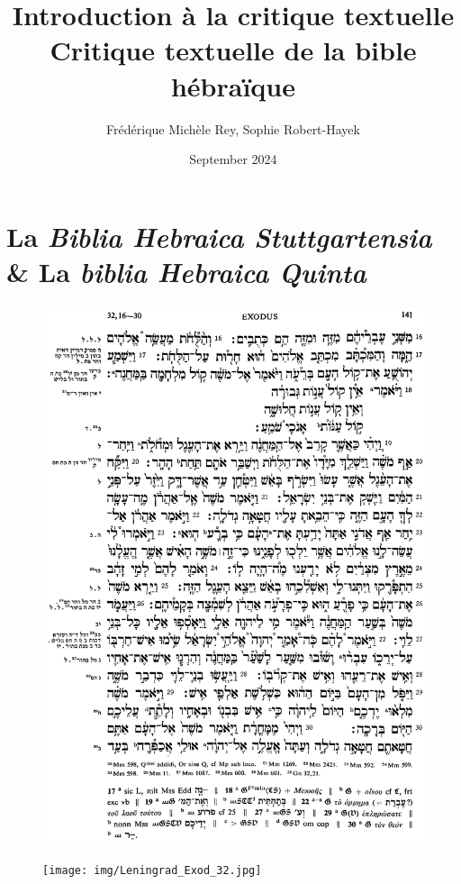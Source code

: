 \documentclass[11pt,a4paper]{article}
\title{Introduction à la critique textuelle\\Critique textuelle de la bible hébraïque}
\author{Frédérique Michèle Rey, Sophie Robert-Hayek}
\date{September 2024}
\begin{document}
\maketitle
\justifying

\section{La \textit{Biblia Hebraica Stuttgartensia} \& La \textit{biblia Hebraica Quinta}}

\begin{figure}[h]
    \begin{minipage}[c]{.46\linewidth}
        \centering            \includegraphics[width=1\linewidth]{img/BHS_Exod_32.png}
    \end{minipage}
    \hfill%
    \begin{minipage}[c]{.46\linewidth}
        \centering
        \texttt{[image: img/Leningrad\_Exod\_32.jpg]}
    \end{minipage}
\end{figure}
\newpage
\end{document}
